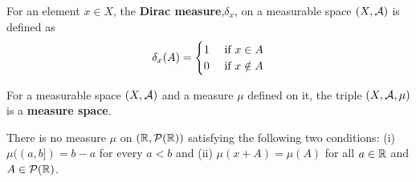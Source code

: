 \documentclass[11pt]{article}
\begin{document}
	\begin{example}
		For an element $x \in X$, the \textbf{Dirac measure},$\delta_x$, on a measurable space $(X, \mathcal{{A}})$ is defined as
		\begin{align}
			\delta_x(A) = \begin{cases}
				1 &\text{{ if }} x \in A \\
				0 &\text{{ if }} x \notin A
			\end{cases}
		\end{align}
	\end{example}
	
	\begin{definition}
		For a measurable space $(X, \mathcal{{A}})$ and a measure $\mu$ defined on it, the triple $(X, \mathcal{{A}}, \mu)$ is a \textbf{measure space}.
	\end{definition}
	
	\begin{theorem} \label{thm:nomeasure}
		There is no measure $\mu$ on $(\mathbb{R}, \mathcal{{P}}(\mathbb{R}))$ satisfying the following two conditions: (i) $\mu((a, b]) = b-a$ for every $a < b$ and (ii) $\mu(x+A) = \mu(A)$ for all $a \in \mathbb{R}$ and $A \in \mathcal{{P}}(\mathbb{R})$. 
	\end{theorem}
	
\end{document}
